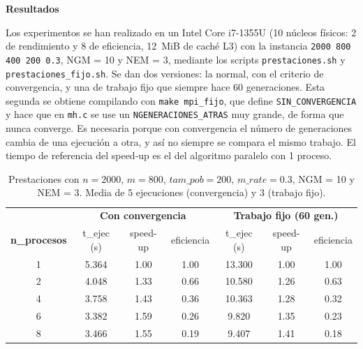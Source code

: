 \documentclass[12pt]{article}
\begin{document}
\begin{enumerate}
\vspace{0.5cm}

\medskip
\noindent\textbf{Resultados}\par
\smallskip

Los experimentos se han realizado en un Intel Core i7-1355U (10 núcleos físicos: 2 de rendimiento y 8 de eficiencia, 12~MiB de caché L3) con la instancia \texttt{2000 800 400 200 0.3}, NGM = 10 y NEM = 3, mediante los scripts \texttt{prestaciones.sh} y \texttt{prestaciones\_fijo.sh}. Se dan dos versiones: la normal, con el criterio de convergencia, y una de trabajo fijo que siempre hace 60 generaciones. Esta segunda se obtiene compilando con \texttt{make mpi\_fijo}, que define \texttt{SIN\_CONVERGENCIA} y hace que en \texttt{mh.c} se use un \texttt{NGENERACIONES\_ATRAS} muy grande, de forma que nunca converge. Es necesaria porque con convergencia el número de generaciones cambia de una ejecución a otra, y así no siempre se compara el mismo trabajo. El tiempo de referencia del speed-up es el del algoritmo paralelo con 1 proceso.

\begin{table}[htbp]
\centering
\begin{tabular}{c|ccc|ccc}
\toprule
& \multicolumn{3}{c|}{\textbf{Con convergencia}} & \multicolumn{3}{c}{\textbf{Trabajo fijo (60 gen.)}} \\
\textbf{n\_procesos} & t\_ejec (s) & speed-up & eficiencia & t\_ejec (s) & speed-up & eficiencia \\
\midrule
1 & 5.364 & 1.00 & 1.00 & 13.300 & 1.00 & 1.00 \\
2 & 4.048 & 1.33 & 0.66 & 10.580 & 1.26 & 0.63 \\
4 & 3.758 & 1.43 & 0.36 & 10.363 & 1.28 & 0.32 \\
6 & 3.382 & 1.59 & 0.26 & 9.820 & 1.35 & 0.23 \\
8 & 3.466 & 1.55 & 0.19 & 9.407 & 1.41 & 0.18 \\
\bottomrule
\end{tabular}
\caption{Prestaciones con $n=2000$, $m=800$, $tam\_pob=200$, $m\_rate=0.3$, NGM = 10 y NEM = 3. Media de 5 ejecuciones (convergencia) y 3 (trabajo fijo).}
\label{tab:c2_prestaciones}
\end{table}


\end{enumerate}
\end{document}
